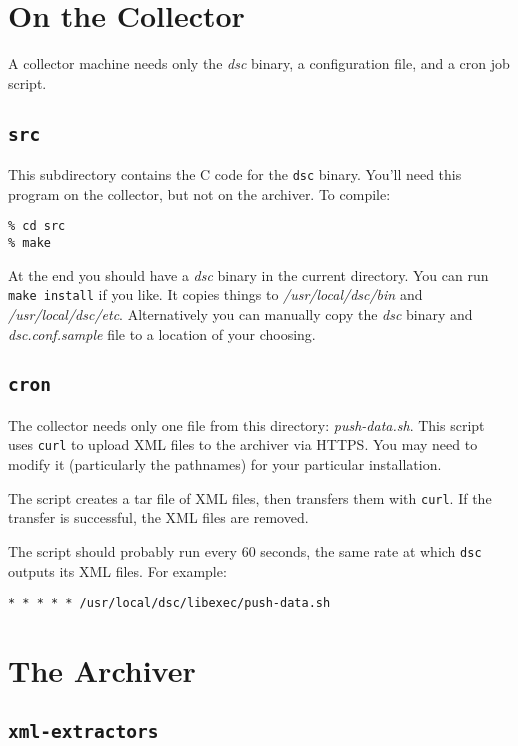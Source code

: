 \documentclass{report}
\begin{document}
\section{On the Collector}

A collector machine needs only the {\em dsc\/} binary, a configuration file,
and a cron job script.

\subsection{\tt src}

This subdirectory contains the C code for the {\tt dsc\/} binary.
You'll need this program on the collector, but not on the archiver.
To compile:

\begin{verbatim}
% cd src
% make
\end{verbatim}

At the end you should have a {\em dsc\/} binary in the current directory.
You can run {\tt make install\/} if you like.  It copies things to
{\em /usr/local/dsc/bin\/} and {\em /usr/local/dsc/etc\/}.
Alternatively you can manually copy the {\em dsc\/} binary and {\em
dsc.conf.sample\/} file to a location of your choosing.

\subsection{\tt cron}

The collector needs only one file from this directory: {\em
push-data.sh\/}.  This script uses {\tt curl\/} to upload XML files
to the archiver via HTTPS.  You may need to modify it (particularly
the pathnames) for your particular installation.

The script creates a tar file of XML files, then transfers them
with {\tt curl\/}.  If the transfer is successful, the XML files
are removed.

The script should probably run every 60 seconds, the same rate at
which {\tt dsc\/} outputs its XML files.  For example:

\begin{verbatim}
* * * * * /usr/local/dsc/libexec/push-data.sh
\end{verbatim}

\section{The Archiver}

\subsection{\tt xml-extractors}
\end{document}
